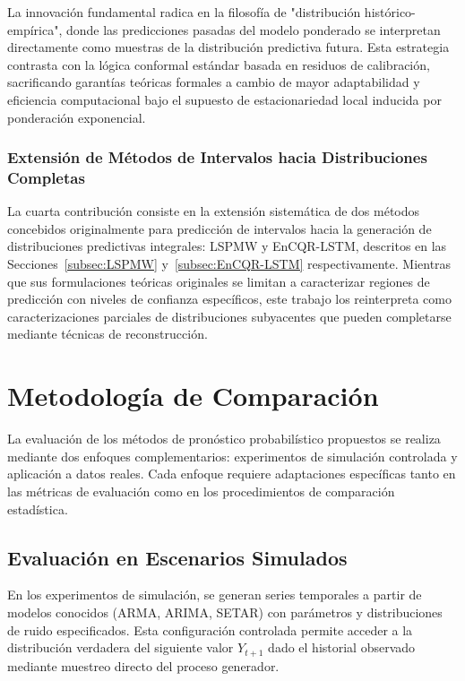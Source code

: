 La innovación fundamental radica en la filosofía de "distribución histórico-empírica", donde las predicciones pasadas del modelo ponderado se interpretan directamente como muestras de la distribución predictiva futura. Esta estrategia contrasta con la lógica conformal estándar basada en residuos de calibración, sacrificando garantías teóricas formales a cambio de mayor adaptabilidad y eficiencia computacional bajo el supuesto de estacionariedad local inducida por ponderación exponencial.


\subsubsection{Extensión de Métodos de Intervalos hacia Distribuciones Completas}

La cuarta contribución consiste en la extensión sistemática de dos métodos concebidos originalmente para predicción de intervalos hacia la generación de distribuciones predictivas integrales: LSPMW y EnCQR-LSTM, descritos en las Secciones~\ref{subsec:LSPMW} y~\ref{subsec:EnCQR-LSTM} respectivamente. Mientras que sus formulaciones teóricas originales se limitan a caracterizar regiones de predicción con niveles de confianza específicos, este trabajo los reinterpreta como caracterizaciones parciales de distribuciones subyacentes que pueden completarse mediante técnicas de reconstrucción.



\section{Metodología de Comparación}
\label{sec:metodologia_comparacion}

La evaluación de los métodos de pronóstico probabilístico propuestos se realiza mediante dos enfoques complementarios: experimentos de simulación controlada y aplicación a datos reales. Cada enfoque requiere adaptaciones específicas tanto en las métricas de evaluación como en los procedimientos de comparación estadística.

\subsection{Evaluación en Escenarios Simulados}

En los experimentos de simulación, se generan series temporales a partir de modelos conocidos (ARMA, ARIMA, SETAR) con parámetros y distribuciones de ruido especificados. Esta configuración controlada permite acceder a la distribución verdadera del siguiente valor $Y_{t+1}$ dado el historial observado mediante muestreo directo del proceso generador.

